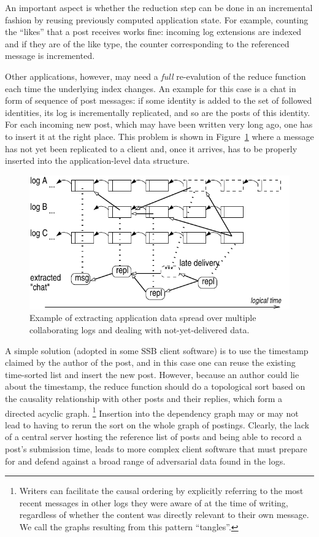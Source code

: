 \documentclass[9pt,sigconf]{acmart}
\begin{document}
An important aspect is whether the reduction step can be done in an
incremental fashion by reusing previously computed application state.
For example, counting the ``likes'' that a post receives works fine:
incoming log extensions are indexed and if they are of the like type,
the counter corresponding to the referenced message is incremented.

Other applications, however, may need a {\em full} re-evalution of the
reduce function each time the underlying index changes. An example for
this case is a chat in form of sequence of post messages: if some identity is added to
the set of followed identities, its log is incrementally replicated, and
so are the posts of this identity. For each incoming new post, which may
have been written very long ago, one has to insert it at the right
place. This problem is shown in Figure~\ref{fig:tangle} where a message
has not yet been replicated to a client and, once it arrives,
has to be properly inserted into the application-level data structure.

\begin{figure}[htb]
  \includegraphics[width=0.9\columnwidth]{figs/tangle.pdf}
  \caption{Example of extracting application data spread over multiple collaborating logs and dealing
    with not-yet-delivered data.\label{fig:tangle}}
\end{figure}

A simple solution (adopted in some SSB client software) is to use the
timestamp claimed by the author of the post, and in this case one can
reuse the existing time-sorted list and insert the new post. However,
because an author could lie about the timestamp, the reduce function
should do a topological sort  based on the causality relationship with
other posts and their replies, which form a directed acyclic graph.
\footnote{Writers can facilitate the causal ordering by explicitly referring to the most recent messages in other logs they were aware of at the time of writing, regardless of whether the content was directly relevant to their own message. We call the graphs resulting from this pattern ``tangles''.} Insertion into the dependency graph may or may not lead to having to rerun the sort on the whole graph of
postings. Clearly, the lack of a central server hosting the reference
list of posts and being able to record a post's submission time, leads
to more complex client software that must prepare for and defend
against a broad range of adversarial data found in the logs.
\end{document}
